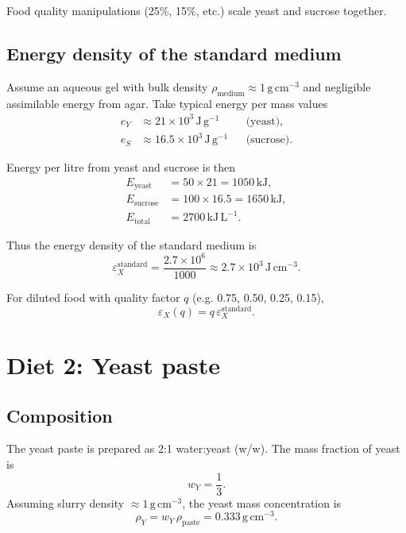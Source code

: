\documentclass[11pt]{article}
\begin{document}
Food quality manipulations (25\%, 15\%, etc.) scale yeast and sucrose together.

\subsection{Energy density of the standard medium}

Assume an aqueous gel with bulk density $\rho_{\text{medium}} \approx 1\,\mathrm{g\,cm^{-3}}$ and negligible assimilable energy from agar. Take typical energy per mass values
\begin{align}
  e_Y &\approx 21\times10^{3}\,\mathrm{J\,g^{-1}} && \text{(yeast)},\\
  e_S &\approx 16.5\times10^{3}\,\mathrm{J\,g^{-1}} && \text{(sucrose)}.
\end{align}

Energy per litre from yeast and sucrose is then
\begin{align}
  E_{\text{yeast}} &= 50\times 21 = 1050\,\mathrm{kJ},\\
  E_{\text{sucrose}} &= 100\times 16.5 = 1650\,\mathrm{kJ},\\
  E_{\text{total}} &= 2700\,\mathrm{kJ\,L^{-1}}.
\end{align}

Thus the energy density of the standard medium is
\begin{equation}
  \varepsilon_X^{\text{standard}} = \frac{2.7\times10^{6}}{1000} \approx 2.7\times10^{3}\,\mathrm{J\,cm^{-3}}.
\end{equation}

For diluted food with quality factor $q$ (e.g. 0.75, 0.50, 0.25, 0.15),
\begin{equation}
  \varepsilon_X(q) = q\,\varepsilon_X^{\text{standard}}.
\end{equation}

\section{Diet 2: Yeast paste}

\subsection{Composition}

The yeast paste is prepared as 2:1 water:yeast (w/w). The mass fraction of yeast is
\begin{equation}
  w_Y = \frac{1}{3}.
\end{equation}
Assuming slurry density $\approx 1\,\mathrm{g\,cm^{-3}}$, the yeast mass concentration is
\begin{equation}
  \rho_Y = w_Y\,\rho_{\text{paste}} = 0.333\,\mathrm{g\,cm^{-3}}.
\end{equation}
\end{document}
